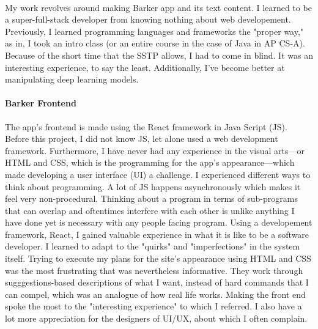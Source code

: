 \documentclass[12pt, letterpaper]{article}
\begin{document}
\paragraph{}My work revolves around making Barker app and its text content. I learned to be a super-full-stack developer from knowing nothing about web developement. Previously, I learned programming languages and frameworks the "proper way," as in, I took an intro class (or an entire course in the case of Java in AP CS-A). Because of the short time that the SSTP allows, I had to come in blind. It was an interesting experience, to say the least. Additionally, I've become better at manipulating deep learning models. 

\paragraph{Barker Frontend}The app's frontend is made using the React framework in Java Script (JS). Before this project, I did not know JS, let alone used a web development framework. Furthermore, I have never had any experience in the visual arts---or HTML and CSS, which is the programming for the app's appearance---which made developing a user interface (UI) a challenge. I experienced different ways to think about programming. A lot of JS happens asynchronously which makes it feel very non-procedural. Thinking about a program in terms of sub-programs that can overlap and oftentimes interfere with each other is unlike anything I have done yet is necessary with any people facing program. Using a developement framework, React, I gained valuable experience in what it is like to be a software developer. I learned to adapt to the "quirks" and "imperfections" in the system itself. Trying to execute my plans for the site's appearance using HTML and CSS was the most frustrating that was nevertheless informative. They work through sugggestions-based descriptions of what I want, instead of hard commands that I can compel, which was an analogue of how real life works. Making the front end spoke the most to the "interesting experience" to which I referred. I also have a lot more appreciation for the designers of UI/UX, about which I often complain.
\end{document}
